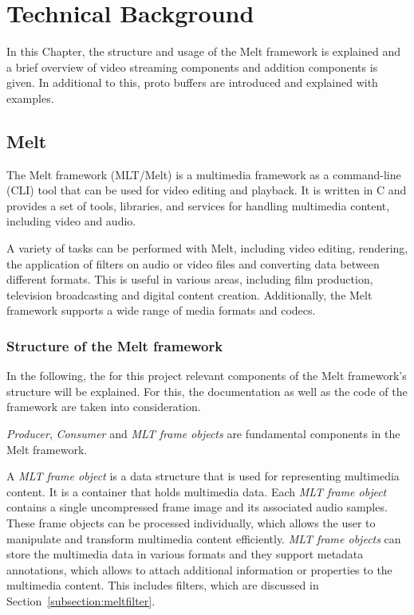 \documentclass[../MasterThesis.tex]{subfiles}
\begin{document}
	
	

\newpage

\section{Technical Background} \label{section:technicalbackground}


In this Chapter, the structure and usage of the Melt framework is explained and a brief overview of video streaming components and addition components is given. In additional to this, proto buffers are introduced and explained with examples.


\subsection{Melt} \label{subsection:melt}

The Melt framework (MLT/Melt) is a multimedia framework as a command-line (CLI) tool that can be used for video editing and playback. It is written in C and provides a set of tools, libraries, and services for handling multimedia content, including video and audio.~\cite{melt} 


A variety of tasks can be performed with Melt, including video editing, rendering, the application of filters on audio or video files and converting data between different formats. 
This is useful in various areas, including film production, television broadcasting and digital content creation. 
Additionally, the Melt framework supports a wide range of media formats and codecs.




\subsubsection*{Structure of the Melt framework}


In the following, the for this project relevant components of the Melt framework's structure will be explained. For this, the documentation as well as the code of the framework are taken into consideration.~\cite{melt, melt_code}

\textit{Producer}, \textit{Consumer} and \textit{MLT frame objects} are fundamental components in the Melt framework.

A \textit{MLT frame object} is a data structure that is used for representing multimedia content. 
It is a container that holds multimedia data. Each \textit{MLT frame object} contains a single uncompressed frame image and its associated audio samples. These frame objects can be processed individually, which allows the user to manipulate and transform multimedia content efficiently.
\textit{MLT frame objects} can store the multimedia data in various formats and they support metadata annotations, which allows to attach additional information or properties to the multimedia content. This includes filters, which are discussed in Section~\ref{subsection:meltfilter}.
\end{document}
